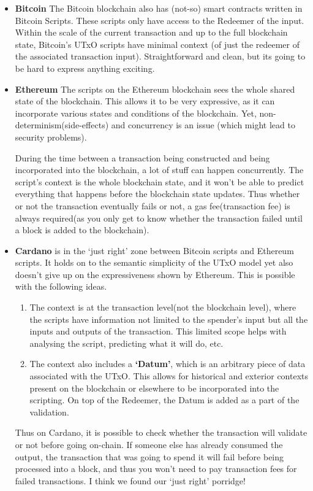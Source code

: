 \documentclass[a4paper, 11pt]{article}
\begin{document}
    \begin{itemize}
        \item \textbf{Bitcoin} The Bitcoin blockchain also has (not-so) smart contracts written in Bitcoin Scripts. These scripts only have access to the Redeemer of the input. Within the scale of the current transaction and up to the full blockchain state, Bitcoin's UTxO scripts have minimal context (of just the redeemer of the associated transaction input). Straightforward and clean, but its going to be hard to express anything exciting.
         
        \item \textbf{Ethereum} The scripts on the Ethereum blockchain sees the whole shared state of the blockchain. This allows it to be very expressive, as it can incorporate various states and conditions of the blockchain. Yet, non-determinism(side-effects) and concurrency is an issue (which might lead to security problems).
        
        During the time between a transaction being constructed and being incorporated into the blockchain, a lot of stuff can happen concurrently. The script's context is the whole blockchain state, and it won't be able to predict everything that happens before the blockchain state updates. Thus whether or not the transaction eventually fails or not, a gas fee(transaction fee) is always required(as you only get to know whether the transaction failed until a block is added to the blockchain). 

        \item \textbf{Cardano} is in the `just right' zone between Bitcoin scripts and Ethereum scripts. It holds on to the semantic simplicity of the UTxO model yet also doesn't give up on the expressiveness shown by Ethereum. This is possible with the following ideas. 
        \begin{enumerate}
            \item The context is at the transaction level(not the blockchain level), where the scripts have information not limited to the spender's input but all the inputs and outputs of the transaction. This limited scope helps with analysing the script, predicting what it will do, etc.
            \item The context also includes a \textbf{`Datum'}, which is an arbitrary piece of data associated with the UTxO. This allows for historical and exterior contexts present on the blockchain or elsewhere to be incorporated into the scripting. On top of the Redeemer, the Datum is added as a part of the validation.
        \end{enumerate} 

        Thus on Cardano, it is possible to check whether the transaction will validate or not before going on-chain. If someone else has already consumed the output, the transaction that was going to spend it will fail before being processed into a block, and thus you won't need to pay transaction fees for failed transactions. I think we found our `just right' porridge!
    \end{itemize}
\end{document}
